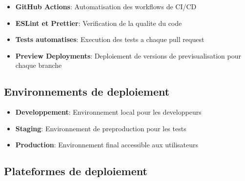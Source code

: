 \begin{itemize}
    \item \textbf{GitHub Actions}: Automatisation des workflows de CI/CD
    \item \textbf{ESLint et Prettier}: Verification de la qualite du code
    \item \textbf{Tests automatises}: Execution des tests a chaque pull request
    \item \textbf{Preview Deployments}: Deploiement de versions de previsualisation pour chaque branche
\end{itemize}

\subsection{Environnements de deploiement}
\begin{itemize}
    \item \textbf{Developpement}: Environnement local pour les developpeurs
    \item \textbf{Staging}: Environnement de preproduction pour les tests
    \item \textbf{Production}: Environnement final accessible aux utilisateurs
\end{itemize}

\subsection{Plateformes de deploiement}
